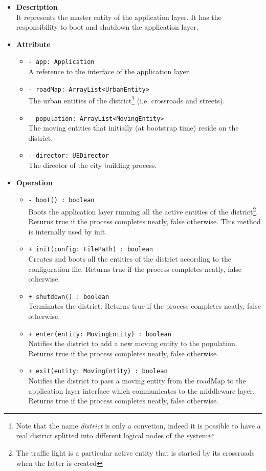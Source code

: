 \begin{itemize}
  \item \textbf{Description} \\
It represents the master entity of the application layer. 
It has the responsibility to boot and shutdown the application layer.
  \item \textbf{Attribute}
  \begin{itemize}
    \item \texttt{- app: Application} \\
A reference to the interface of the application layer.
    \item \texttt{- roadMap: ArrayList<UrbanEntity>} \\
The urban entities of the district\footnote{Note that the name 
\textit{district} is only a convetion, indeed it is possible to have a 
real district splitted into different logical nodes of the system}
(i.e. crossroads and streets). 
    \item \texttt{- population: ArrayList<MovingEntity>} \\
The moving entities that initially (at bootstrap time) reside on the district.
    \item \texttt{- director: UEDirector} \\ 
The director of the city building process.
  \end{itemize}
  \item \textbf{Operation}
  \begin{itemize} 
    \item \texttt{- boot() : boolean} \\
Boots the application layer running all the active entities of the 
district\footnote{The traffic light is a particular active entity that 
is started by its crossroads when the latter is created}. 
Returns true if the process completes neatly, false otherwise. 
This method is internally used by init.
    \item \texttt{+ init(config: FilePath) : boolean} \\
Creates and boots all the entities of the district according to the 
configuration file. Returns true if the process completes neatly, false 
otherwise.
    \item \texttt{+ shutdown() : boolean} \\
Terminates the district. Returns true if the process completes neatly,
false otherwise.
    \item \texttt{+ enter(entity: MovingEntity) : boolean} \\
Notifies the district to add a new moving entity to the population.
Returns true if the process completes neatly, false otherwise.
    \item \texttt{+ exit(entity: MovingEntity) : boolean} \\
Notifies the district to pass a moving entity from the roadMap to the 
application layer interface which communicates to the middleware layer.
Returns true if the process completes neatly, false otherwise.
  \end{itemize}
\end{itemize} 
